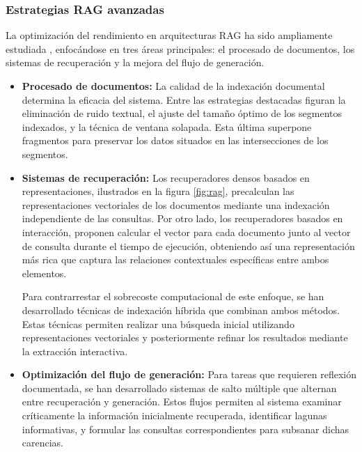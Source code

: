 \subsubsection{Estrategias RAG avanzadas}
La optimización del rendimiento en arquitecturas RAG ha sido ampliamente estudiada \cite{zhu_retrieving_2021}\cite{gao_retrieval-augmented_2024}, enfocándose en tres áreas principales: el procesado de documentos, los sistemas de recuperación y la mejora del flujo de generación.
\begin{itemize}
  \item {\textbf{Procesado de documentos:}} La calidad de la indexación documental determina la eficacia del sistema. Entre las estrategias destacadas figuran la eliminación de ruido textual, el ajuste del tamaño óptimo de los segmentos indexados, y la técnica de ventana solapada. Esta última superpone fragmentos para preservar los datos situados en las intersecciones de los segmentos. 

\item {\textbf{Sistemas de recuperación:}} Los recuperadores densos basados en representaciones, ilustrados en la figura \ref{fig:rag}, precalculan las representaciones vectoriales de los documentos mediante una indexación independiente de las consultas. Por otro lado, los recuperadores basados en interacción, proponen calcular el vector para cada documento junto al vector de consulta durante el tiempo de ejecución, obteniendo así una representación más rica que captura las relaciones contextuales específicas entre ambos elementos\cite{ma_query_nodate}\cite{levine_standing_2022}.

Para contrarrestar el sobrecoste computacional de este enfoque, se han desarrollado técnicas de indexación híbrida que combinan ambos métodos. Estas técnicas permiten realizar una búsqueda inicial utilizando representaciones vectoriales y posteriormente refinar los resultados mediante la extracción interactiva\cite{khattab_relevance-guided_2021}. 
  
\item {\textbf{Optimización del flujo de generación:}} Para tareas que requieren reflexión documentada, se han desarrollado sistemas de salto múltiple que alternan entre recuperación y generación\cite{khattab_demonstrate-search-predict_2023}\cite{shao_enhancing_2023}\cite{qi_answering_2021}\cite{zheng_take_2024}\cite{trivedi_interleaving_2023}. Estos flujos permiten al sistema examinar críticamente la información inicialmente recuperada, identificar lagunas informativas, y formular las consultas correspondientes para subsanar dichas carencias.

\end{itemize}

